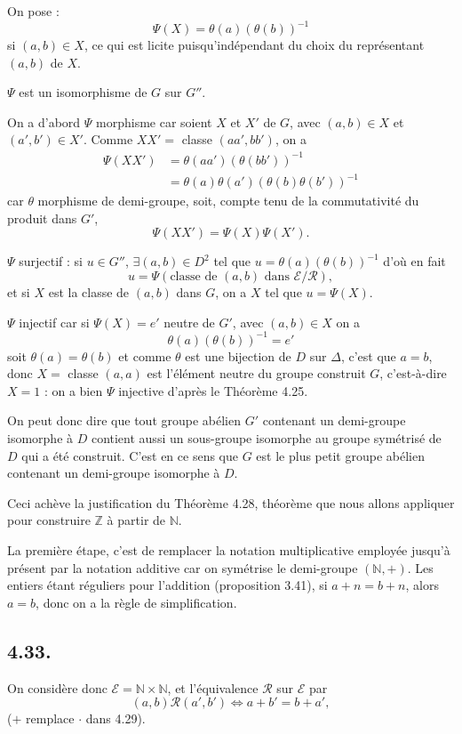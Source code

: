 On pose :
\[
\Psi(X)=\theta(a)(\theta(b))^{-1}
\]
si $(a,b)\in X$, ce qui est licite puisqu'indépendant du choix du représentant $(a,b)$ de $X$.

$\Psi$ est un isomorphisme de $G$ sur $G''$.

On a d'abord $\Psi$ morphisme car soient $X$ et $X'$ de $G$, avec $(a,b)\in X$ et $(a',b')\in X'$. Comme $XX'=$ classe $(aa',bb')$, on a
\begin{align*}
\Psi(XX')
&=\theta(aa')(\theta(bb'))^{-1}\\
&=\theta(a)\theta(a')(\theta(b)\theta(b'))^{-1}
\end{align*}
car $\theta$ morphisme de demi-groupe, soit, compte tenu de la commutativité du produit dans $G'$,
\[
\Psi(XX')=\Psi(X)\Psi(X').
\]

$\Psi$ surjectif : si $u\in G''$, $\exists(a,b)\in D^2$ tel que $u=\theta(a)(\theta(b))^{-1}$ d'où en fait
\[
u=\Psi(\text{classe de }(a,b)\text{ dans }\mathcal E/\mathcal R),
\]
et si $X$ est la classe de $(a,b)$ dans $G$, on a $X$ tel que $u=\Psi(X)$.

$\Psi$ injectif car si $\Psi(X)=e'$ neutre de $G'$, avec $(a,b)\in X$ on a
\[
\theta(a)(\theta(b))^{-1}=e'
\]
soit $\theta(a)=\theta(b)$ et comme $\theta$ est une bijection de $D$ sur $\Delta$, c'est que $a=b$, donc $X=$ classe $(a,a)$ est l'élément neutre du groupe construit $G$, c'est-à-dire $X=1$ : on a bien $\Psi$ injective d'après le Théorème 4.25. \bookend

On peut donc dire que tout groupe abélien $G'$ contenant un demi-groupe isomorphe à $D$ contient aussi un sous-groupe isomorphe au groupe symétrisé de $D$ qui a été construit. C'est en ce sens que $G$ est le plus petit groupe abélien contenant un demi-groupe isomorphe à $D$.

Ceci achève la justification du Théorème 4.28, théorème que nous allons appliquer pour construire $\mathbb Z$ à partir de $\mathbb N$.



La première étape, c'est de remplacer la notation multiplicative employée jusqu'à présent par la notation additive car on symétrise le demi-groupe $(\mathbb N,+)$. Les entiers étant réguliers pour l'addition (proposition 3.41), si $a+n=b+n$, alors $a=b$, donc on a la règle de simplification.

\subsection*{4.33.}
On considère donc $\mathcal E=\mathbb N\times\mathbb N$, et l'équivalence $\mathcal R$  sur $\mathcal E$ par
\[
(a,b)\mathcal R(a',b')\Longleftrightarrow a+b'=b+a',
\]
($+$ remplace $\cdot$ dans 4.29).

